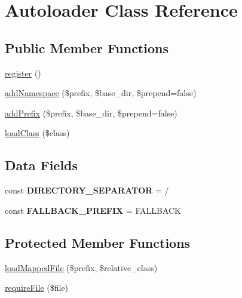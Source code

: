 \hypertarget{class_pes_1_1_autoloader_1_1_autoloader}{}\section{Autoloader Class Reference}
\label{class_pes_1_1_autoloader_1_1_autoloader}
\subsection*{Public Member Functions}
\begin{DoxyCompactItemize}
\item 
\mbox{\hyperlink{class_pes_1_1_autoloader_1_1_autoloader_acc294a6cc8e69743746820e3d15e3f78}{register}} ()
\item 
\mbox{\hyperlink{class_pes_1_1_autoloader_1_1_autoloader_afdf0b976693d442488b04e52b99c7649}{add\+Namespace}} (\$prefix, \$base\+\_\+dir, \$prepend=false)
\item 
\mbox{\hyperlink{class_pes_1_1_autoloader_1_1_autoloader_a2052406898892891865b67c4f06159d3}{add\+Prefix}} (\$prefix, \$base\+\_\+dir, \$prepend=false)
\item 
\mbox{\hyperlink{class_pes_1_1_autoloader_1_1_autoloader_a8326a997d0cfe76d80196f60d240d144}{load\+Class}} (\$class)
\end{DoxyCompactItemize}
\subsection*{Data Fields}
\begin{DoxyCompactItemize}
\item 
\mbox{\label{class_pes_1_1_autoloader_1_1_autoloader_a56e71099de3d892626872a77665e21c0}} 
const {\bfseries D\+I\+R\+E\+C\+T\+O\+R\+Y\+\_\+\+S\+E\+P\+A\+R\+A\+T\+OR} = \textquotesingle{}/\textquotesingle{}
\item 
\mbox{\label{class_pes_1_1_autoloader_1_1_autoloader_a7d12fe829cb7ac5c0b0f650355b038b5}} 
const {\bfseries F\+A\+L\+L\+B\+A\+C\+K\+\_\+\+P\+R\+E\+F\+IX} = \textquotesingle{}F\+A\+L\+L\+B\+A\+CK\textquotesingle{}
\end{DoxyCompactItemize}
\subsection*{Protected Member Functions}
\begin{DoxyCompactItemize}
\item 
\mbox{\hyperlink{class_pes_1_1_autoloader_1_1_autoloader_a21e9141a0afc86bf7869c37394b22e19}{load\+Mapped\+File}} (\$prefix, \$relative\+\_\+class)
\item 
\mbox{\hyperlink{class_pes_1_1_autoloader_1_1_autoloader_a6e45e88bb3272cdfbac850a8789683d3}{require\+File}} (\$file)
\end{DoxyCompactItemize}
